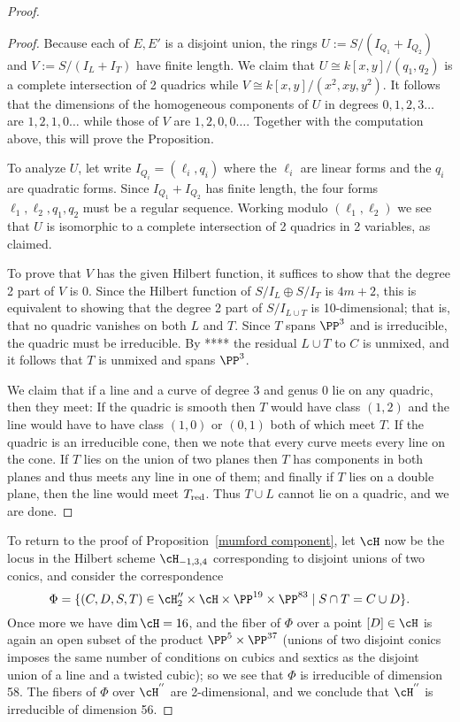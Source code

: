 \begin{proof}
\begin{proof}
Because each of $E,E'$ is a disjoint union, the rings $U := S/(I_{Q_1}+I_{Q_2})$ and $V := S/(I_L+I_T)$
have finite length. We claim that $U \cong k[x,y]/(q_1,q_2)$ is a complete intersection of 2 quadrics while
$V \cong k[x,y]/(x^2,xy,y^2)$. It follows that the dimensions of the homogeneous components of 
$U$ in degrees $0,1,2,3\dots$ are $1,2,1,0\dots$ while those of $V$ are $1,2,0,0\dots$. Together
with the computation above, this will prove the Proposition.

To analyze $U$, let write $I_{Q_i} = (\ell_i, q_i)$ where the $\ell_i$ are linear forms and the $q_i$ are 
quadratic forms. Since $I_{Q_1} +I_{Q_2}$ has finite length, the four forms
$\ell_1,\ell_2,q_1,q_2$ must be a regular sequence. Working modulo $(\ell_1,\ell_2)$ we see that 
$U$ is isomorphic to a complete intersection of 2 quadrics in 2 variables, as claimed.

To prove that $V$ has the given Hilbert function, it suffices to show that the degree 2 part of $V$ is 0. Since the Hilbert function of $S/I_L \oplus S/I_T$ is $4m+2$, this is equivalent to showing that the degree 2 part of
$S/I_{L\cup T}$ is 10-dimensional; that is, that no quadric vanishes on
both $L$ and $T$. Since $T$ spans $\PP^3$ and is irreducible, the quadric must be irreducible. By ****
the residual $L\cup T$ to $C$ is unmixed, and it follows that $T$ is unmixed and spans $\PP^{3}$. 

We claim that if a line and a curve of degree 3 and genus 0 lie on any quadric, then they meet: If the quadric is smooth then $T$ would have class $(1,2)$ and the line would have to have class $(1,0)$ or
$(0,1)$ both of which meet $T$. If the quadric is an irreducible cone, then we note that  every curve meets every line on the cone. If $T$ lies on the union of two planes then $T$ has components in both planes and thus meets any line in one of them; and finally if $T$ lies on a double plane, then the line would meet $T_{\rm red}$. Thus
$T\cup L$ cannot lie on a quadric, and we are done.
\end{proof}


To return to the proof of Proposition~\ref{mumford component}, let $\cH$ now be the locus in the Hilbert scheme $\cH_{-1,3,4}$ corresponding to disjoint unions of two conics, and consider the correspondence
$$
\Phi = \{(C,D,S,T) \in \cH_{2}'' \times \cH \times \PP^{19} \times \PP^{83} \mid S \cap T = C \cup D \}.
$$
Once more we have $\dim \cH = 16$, and the fiber of $\Phi$ over a point $[D] \in \cH$ is again an open subset of the product $\PP^5 \times \PP^{37}$ (unions of two disjoint conics imposes the same number of conditions on cubics and sextics as the disjoint union of a line and a twisted cubic); so we see that $\Phi$ is irreducible of dimension 58. The fibers of $\Phi$ over $ \cH^{''}$ are 2-dimensional, and we conclude that $ \cH^{''}$ is irreducible of dimension 56.


\end{proof}
